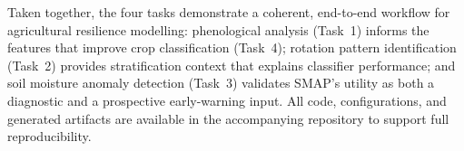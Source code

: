 \documentclass{article}
\begin{document}
Taken together, the four tasks demonstrate a coherent, end-to-end
workflow for agricultural resilience modelling: phenological analysis
(Task~1) informs the features that improve crop classification
(Task~4); rotation pattern identification (Task~2) provides
stratification context that explains classifier performance; and soil
moisture anomaly detection (Task~3) validates SMAP's utility as both a
diagnostic and a prospective early-warning input.
All code, configurations, and generated artifacts are available in the
accompanying repository to support full reproducibility.

\newpage


\end{document}
